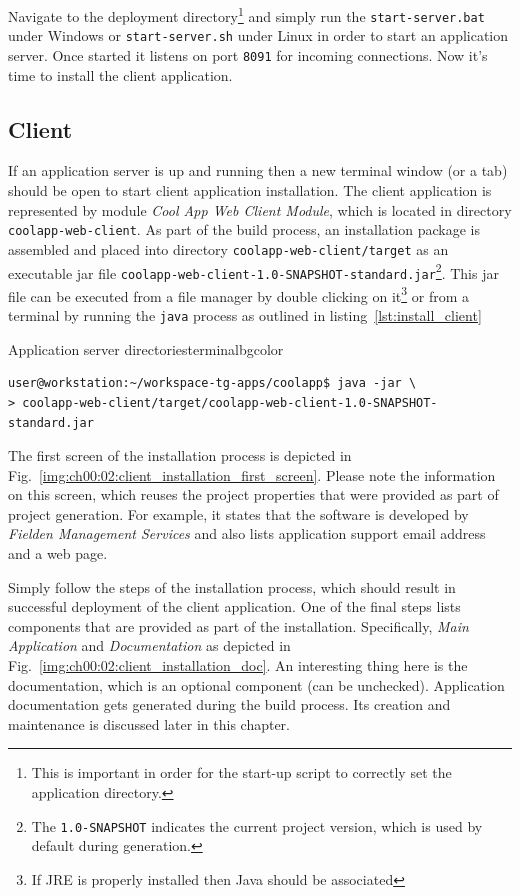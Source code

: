   Navigate to the deployment directory\footnote{This is important in order for the start-up script to correctly set the application directory.} and simply run the \texttt{start-server.bat} under Windows or \texttt{start-server.sh} under Linux in order to start an application server.
  Once started it listens on port \texttt{8091} for incoming connections.
  Now it's time to install the client application.

\subsection{Client}\label{ch00:02:client}
  \sloppypar
  If an application server is up and running then a new terminal window (or a tab) should be open to start client application installation.
  The client application is represented by module \emph{Cool App Web Client Module}, which is located in directory \texttt{coolapp-web-client}.
  As part of the build process, an installation package is assembled and placed into directory \texttt{coolapp-web-client/target} as an executable jar file \texttt{coolapp-web-client-1.0-SNAPSHOT-standard.jar}\footnote{The \texttt{1.0-SNAPSHOT} indicates the current project version, which is used by default during generation.}.   
  This jar file can be executed from a file manager by double clicking on it\footnote{If JRE is properly installed then Java should be associated} or from a terminal by running the \texttt{java} process as outlined in listing~\ref{lst:install_client}

  \begin{code}{Application server directories}{\label{lst:install_client}}{terminalbgcolor}
     \begin{lstlisting}
user@workstation:~/workspace-tg-apps/coolapp$ java -jar \
> coolapp-web-client/target/coolapp-web-client-1.0-SNAPSHOT-standard.jar
     \end{lstlisting}
  \end{code}

  The first screen of the installation process is depicted in Fig.~\ref{img:ch00:02:client_installation_first_screen}.
  Please note the information on this screen, which reuses the project properties that were provided as part of project generation.
  For example, it states that the software is developed by \emph{Fielden Management Services} and also lists application support email address and a web page.
  
  Simply follow the steps of the installation process, which should result in successful deployment of the client application.
  One of the final steps lists components that are provided as part of the installation.
  Specifically, \emph{Main Application} and \emph{Documentation} as depicted in Fig.~\ref{img:ch00:02:client_installation_doc}.
  An interesting thing here is the documentation, which is an optional component (can be unchecked).
  Application documentation gets generated during the build process.
  Its creation and maintenance is discussed later in this chapter.

